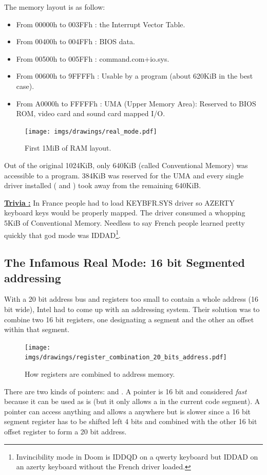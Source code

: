 \documentclass[book.tex]{subfiles}
\begin{document}
  \bigskip
The memory layout is as follow:
\begin{itemize}
\item From 00000h to 003FFh : the Interrupt Vector Table.
\item From 00400h to 004FFh : BIOS data.
\item From 00500h to 005FFh : command.com+io.sys.
\item From 00600h to 9FFFFh : Usable by a program (about 620KiB in the best case). 
\item From A0000h to FFFFFh : UMA (Upper Memory Area): Reserved to BIOS ROM, video card and sound card mapped I/O.
\end{itemize}
\par
\begin{figure}[H]
\centering
\texttt{[image: imgs/drawings/real\_mode.pdf]}
\caption{First 1MiB of RAM layout.}
\label{fig:fp_internals}
\end{figure}
\pagebreak

Out of the original 1024KiB, only 640KiB (called Conventional Memory) was accessible to a program. 384KiB was reserved for the UMA and every single driver installed ( and ) took away from the remaining 640KiB.

\bigskip

\textbf{\underline{Trivia :}}  In France people had to load KEYBFR.SYS driver so AZERTY keyboard keys would be properly mapped. The driver consumed a whopping 5KiB of Conventional Memory. Needless to say French people learned pretty quickly that god mode was IDDAD\footnote{Invincibility mode in Doom is IDDQD on a qwerty keyboard but IDDAD on an azerty keyboard without the French driver loaded.}.\\
\par





\subsection{The Infamous Real Mode: 16 bit Segmented addressing}
With a 20 bit address bus and registers too small to contain a whole address (16 bit wide), Intel had to come up with an addressing system. Their solution was to combine two 16 bit registers, one designating a segment and the other an offset within that segment.\\
\par
\begin{figure}[H]
\centering
\texttt{[image: imgs/drawings/register\_combination\_20\_bits\_address.pdf]}
\caption{How registers are combined to address memory.}
\label{fig:register_comb_to_20_bits}
\end{figure}
\par
There are two kinds of pointers:  and . A  pointer is 16 bit and considered \emph{fast} because it can be used as is (but it only allows a  in the current code segment). A  pointer can access anything and allows a  anywhere but is slower since a 16 bit segment register has to be shifted left 4 bits and combined with the other 16 bit offset register to form a 20 bit address.\\
\end{document}
